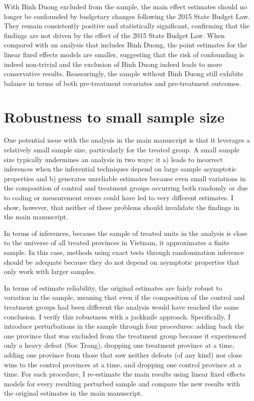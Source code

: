 \documentclass[12pt]{article}
\newcommand{\1}{\mathbbm{1}}
\begin{document}
With Binh Duong excluded from the sample, the main effect estimates should no longer be confounded by budgetary changes following the 2015 State Budget Law. They remain consistently positive and statistically significant, confirming that the findings are not driven by the effect of the 2015 State Budget Law. When compared with an analysis that includes Binh Duong, the point estimates for the linear fixed effects models are smaller, suggesting that the risk of confounding is indeed non-trivial and the exclusion of Binh Duong indeed leads to more conservative results. Reassuringly, the sample without Binh Duong still exhibits balance in terms of both pre-treatment covariates and pre-treatment outcomes.

\clearpage

\section{Robustness to small sample size}
\label{app:small_sample}

One potential issue with the analysis in the main manuscript is that it leverages a relatively small sample size, particularly for the treated group. A small sample size typically undermines an analysis in two ways: it a) leads to incorrect inferences when the inferential techniques depend on large sample asymptotic properties and b) generates unreliable estimates because even small variations in the composition of control and treatment groups occurring both randomly or due to coding or measurement errors could have led to very different estimates. I show, however, that neither of these problems should invalidate the findings in the main manuscript.

In terms of inferences, because the sample of treated units in the analysis is close to the universe of all treated provinces in Vietnam, it approximates a finite sample. In this case, methods using exact tests through randomization inference should be adequate because they do not depend on asymptotic properties that only work with larger samples.

In terms of estimate reliability, the original estimates are fairly robust to variation in the sample, meaning that even if the composition of the control and treatment groups had been different the analysis would have reached the same conclusion. I verify this robustness with a jackknife approach. Specifically, I introduce perturbations in the sample through four procedures: adding back the one province that was excluded from the treatment group because it experienced only a heavy defeat (Soc Trang), dropping one treatment province at a time, adding one province from those that saw neither defeats (of any kind) nor close wins to the control provinces at a time, and dropping one control province at a time. For each procedure, I re-estimate the main results using linear fixed effects models for every resulting perturbed sample and compare the new results with the original estimates in the main manuscript.
\end{document}
